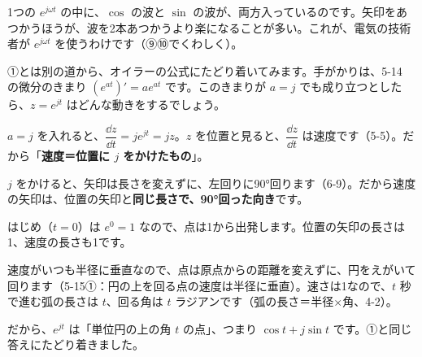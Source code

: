 1つの $e^{j\omega t}$ の中に、$\cos$ の波と $\sin$ の波が、両方入っているのです。矢印をあつかうほうが、波を2本あつかうより楽になることが多い。これが、電気の技術者が $e^{j\omega t}$ を使うわけです（⑨⑩でくわしく）。



\label{bk:6-10:bibun}①とは別の道から、オイラーの公式にたどり着いてみます。手がかりは、5-14 の微分のきまり $(e^{at})'=ae^{at}$ です。このきまりが $a=j$ でも成り立つとしたら、$z=e^{jt}$ はどんな動きをするでしょう。

\begin{enumerate}[label={\bkcircled[\bkTF]{\arabic*}}, leftmargin=2.4\zw, itemsep=2pt, topsep=2pt]
\item $a=j$ を入れると、$\dfrac{\dd z}{\dd t}=je^{jt}=jz$。$z$ を位置と見ると、$\dfrac{\dd z}{\dd t}$ は速度です（5-5）。だから「\textbf{速度＝位置に $j$ をかけたもの}」。
\item $j$ をかけると、矢印は長さを変えずに、左回りに90°回ります（6-9）。だから速度の矢印は、位置の矢印と\textbf{同じ長さで、90°回った向き}です。
\item はじめ（$t=0$）は $e^0=1$ なので、点は1から出発します。位置の矢印の長さは1、速度の長さも1です。
\item 速度がいつも半径に垂直なので、点は原点からの距離を変えずに、円をえがいて回ります（5-15①：円の上を回る点の速度は半径に垂直）。速さは1なので、$t$ 秒で進む弧の長さは $t$、回る角は $t$ ラジアンです（弧の長さ＝半径×角、4-2）。
\end{enumerate}
だから、$e^{jt}$ は「単位円の上の角 $t$ の点」、つまり $\cos t+j\sin t$ です。①と同じ答えにたどり着きました。

